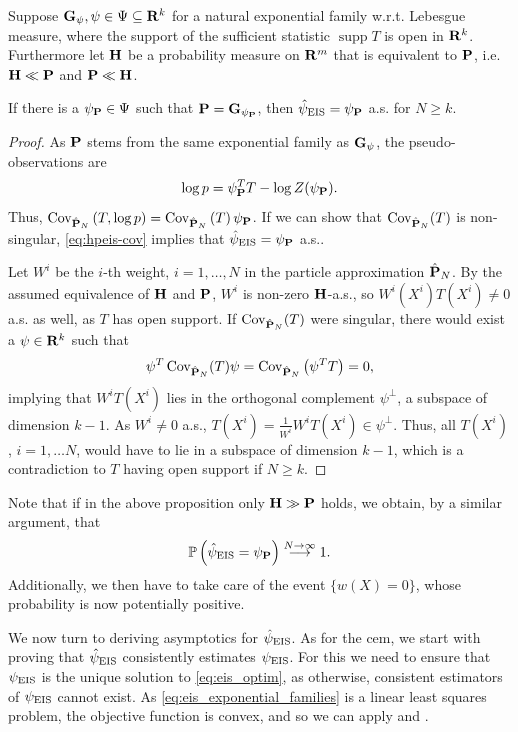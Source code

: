 \begin{proposition}
    \label{prop:eis-finite-sample}
    Suppose $\G_{\psi}, \psi \in \Psi \subseteq \R^{k}$ for a natural exponential family w.r.t. Lebesgue measure, where the support of the sufficient statistic $\operatorname{supp} T$ is open in $\R^{k}$. 
    Furthermore let $\H$ be a probability measure on $\R^{m}$ that is equivalent to $\P$, i.e. $\H \ll \P$ and $\P \ll \H$. 

    If there is a $\psi_{\P} \in \Psi$ such that $\P = \G_{\psi_{\P}}$, then $\hpeis = \psi_{\P}$ a.s. for $N \geq k$. 
\end{proposition}

\begin{proof}
    As $\P$ stems from the same exponential family as $\G_{\psi}$, the pseudo-observations are $$\log p  = \psi_{\P}^T T - \log Z(\psi_{\P}).$$ Thus, $\cov_{\hat \P_{N}} \left( T, \log p  \right) = \cov_{\hat \P_{N}} \left( T \right)\psi_{\P}$. 
    If we can show that $\cov_{\hat\P_{N}} (T)$ is non-singular, \eqref{eq:hpeis-cov} implies that $\hpeis = \psi_{\P}$ a.s.. 

    Let $W^{i}$ be the $i$-th weight, $i = 1,\dots, N$ in the particle approximation $\hat \P_{N}$.
    By the assumed equivalence of $\H$ and $\P$, $W^{i}$ is non-zero $\H$-a.s., so $W^{i}(X^{i})T(X^{i}) \neq 0$ a.s. as well, as $T$ has open support.
    If $\cov_{\hat \P_{N}} (T)$ were singular, there would exist a $\psi \in \R^{k}$ such that
    $$
    \psi^{T} \cov_{\hat\P_{N}} (T) \psi = \cov_{\hat \P_{N}} \left( \psi^{T}T \right) = 0,
    $$
    implying that $W^{i} T(X^{i})$ lies in the orthogonal complement $\psi^{\perp}$, a subspace of dimension $k - 1$.
    As $W^{i} \neq 0$ a.s., $T(X^{i}) = \frac{1}{W^{i}} W^{i} T(X^{i}) \in \psi^{\perp}$.
    Thus, all $T(X^{i})$, $i = 1, \dots N$, would have to lie in a subspace of dimension $k - 1$, which is a contradiction to $T$ having open support if $N \geq k$.
\end{proof}

Note that if in the above proposition only $\H \gg \P$ holds, we obtain, by a similar argument, that $$\mathbb P \left( \hpeis = \psi_{\P} \right) \stackrel{N\to\infty}\longrightarrow 1.$$
Additionally, we then have to take care of the event $ \{ w(X) = 0 \}$, whose probability is now potentially positive.

We now turn to deriving asymptotics for $\hpeis$. As for the \gls{cem}, we start with proving that $\hpeis$ consistently estimates $\peis$.
For this we need to ensure that $\peis$ is the unique solution to \eqref{eq:eis_optim}, as otherwise, consistent estimators of $\peis$ cannot exist. 
As \eqref{eq:eis_exponential_families} is a linear least squares problem, the objective function is convex, and so we can apply  and .

